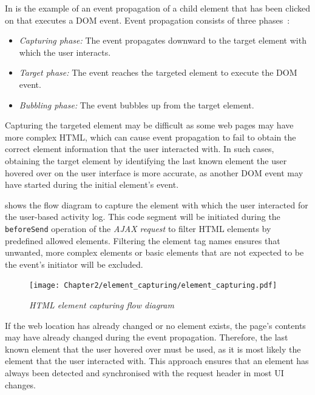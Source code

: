 In  is the example of an event propagation of a child element that has been clicked on that executes a DOM event. Event propagation consists of three phases~\cite{EventBubbling}:

\begin{itemize}
	\item \textit{Capturing phase:} The event propagates downward to the target element with which the user interacts.
	\item \textit{Target phase:} The event reaches the targeted element to execute the DOM event.
	\item \textit{Bubbling phase:} The event bubbles up from the target element.
\end{itemize}

Capturing the targeted element may be difficult as some web pages may have more complex HTML, which can cause event propagation to fail to obtain the correct element information that the user interacted with. In such cases, obtaining the target element by identifying the last known element the user hovered over on the user interface is more accurate, as another DOM event may have started during the initial element's event.\par {} shows the flow diagram to capture the element with which the user interacted for the user-based activity log. This code segment will be initiated during the \texttt{beforeSend} operation of the \textit{AJAX request} to filter HTML elements by predefined allowed elements. Filtering the element tag names ensures that unwanted, more complex elements or basic elements that are not expected to be the event's initiator will be excluded. 

\begin{figure}[!htb]
	\centering %
	\texttt{[image: Chapter2/element\_capturing/element\_capturing.pdf]}
	\caption[HTML element capturing flow diagram]
	{\textit{HTML element capturing flow diagram}}\label{fig:ch3_element_event_capturing}
\end{figure}

If the web location has already changed or no element exists, the page's contents may have already changed during the event propagation. Therefore, the last known element that the user hovered over must be used, as it is most likely the element that the user interacted with. This approach ensures that an element has always been detected and synchronised with the request header in most UI changes.

